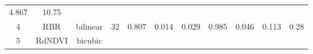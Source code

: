 \documentclass[twoside,12pt,final]{ucthesis-CA2012}
\begin{document}
\begin{ucmainmatter}
\begin{longtable}[]{@{}ccccccccccc@{}}
\begin{minipage}[t]{0.05\columnwidth}
4.867\strut
\end{minipage} & \begin{minipage}[t]{0.05\columnwidth}\centering\strut
10.75\strut
\end{minipage}\tabularnewline
\begin{minipage}[t]{0.04\columnwidth}\centering\strut
4\strut
\end{minipage} & \begin{minipage}[t]{0.11\columnwidth}\centering\strut
RBR\strut
\end{minipage} & \begin{minipage}[t]{0.06\columnwidth}\centering\strut
bilinear\strut
\end{minipage} & \begin{minipage}[t]{0.08\columnwidth}\centering\strut
32\strut
\end{minipage} & \begin{minipage}[t]{0.08\columnwidth}\centering\strut
0.807\strut
\end{minipage} & \begin{minipage}[t]{0.07\columnwidth}\centering\strut
0.014\strut
\end{minipage} & \begin{minipage}[t]{0.07\columnwidth}\centering\strut
0.029\strut
\end{minipage} & \begin{minipage}[t]{0.07\columnwidth}\centering\strut
0.985\strut
\end{minipage} & \begin{minipage}[t]{0.05\columnwidth}\centering\strut
0.046\strut
\end{minipage} & \begin{minipage}[t]{0.05\columnwidth}\centering\strut
0.113\strut
\end{minipage} & \begin{minipage}[t]{0.05\columnwidth}\centering\strut
0.28\strut
\end{minipage}\tabularnewline
\begin{minipage}[t]{0.04\columnwidth}\centering\strut
5\strut
\end{minipage} & \begin{minipage}[t]{0.11\columnwidth}\centering\strut
RdNDVI\strut
\end{minipage} & \begin{minipage}[t]{0.06\columnwidth}\centering\strut
bicubic\strut
\end{minipage} & \begin{minipage}[t]{0.08\columnwidth}\centering\strut

\end{minipage}
\end{longtable}
\end{ucmainmatter}
\end{document}
